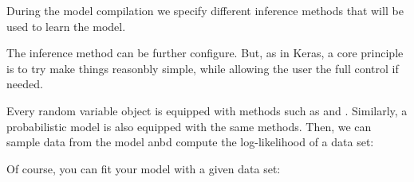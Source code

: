 \documentclass[letterpaper,10pt,english]{sphinxmanual}
\begin{document}
During the model compilation we specify different inference methods that
will be used to learn the model.

\begin{sphinxVerbatim}[commandchars=\\\{\}]
   

    \PYG{p}{[}\PYG{p}{]}

  
\end{sphinxVerbatim}

The inference method can be further configure. But, as in Keras, a core
principle is to try make things reasonbly simple, while allowing the
user the full control if needed.

Every random variable object is equipped with methods such as
 and . Similarly, a probabilistic model is also
equipped with the same methods. Then, we can sample data from the model
anbd compute the log-likelihood of a data set:

\begin{sphinxVerbatim}[commandchars=\\\{\}]
    

  
\end{sphinxVerbatim}

Of course, you can fit your model with a given data set:

\begin{sphinxVerbatim}[commandchars=\\\{\}]

  
\end{sphinxVerbatim}
\end{document}
